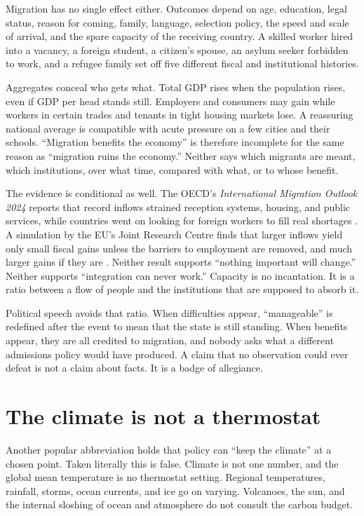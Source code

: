 \documentclass[12pt,a4paper]{book}
\begin{document}
Migration has no single effect either. Outcomes depend on age, education, legal status, reason for coming, family, language, selection policy, the speed and scale of arrival, and the spare capacity of the receiving country. A skilled worker hired into a vacancy, a foreign student, a citizen's spouse, an asylum seeker forbidden to work, and a refugee family set off five different fiscal and institutional histories.

Aggregates conceal who gets what. Total GDP rises when the population rises, even if GDP per head stands still. Employers and consumers may gain while workers in certain trades and tenants in tight housing markets lose. A reassuring national average is compatible with acute pressure on a few cities and their schools. ``Migration benefits the economy'' is therefore incomplete for the same reason as ``migration ruins the economy.'' Neither says which migrants are meant, which institutions, over what time, compared with what, or to whose benefit.

The evidence is conditional as well. The OECD's \emph{International Migration Outlook 2024} reports that record inflows strained reception systems, housing, and public services, while countries went on looking for foreign workers to fill real shortages \cite{OECDMigrationOutlook2024}. A simulation by the EU's Joint Research Centre finds that larger inflows yield only small fiscal gains unless the barriers to employment are removed, and much larger gains if they are \cite{JRCFiscalMigration2020}. Neither result supports ``nothing important will change.'' Neither supports ``integration can never work.'' Capacity is no incantation. It is a ratio between a flow of people and the institutions that are supposed to absorb it.

Political speech avoids that ratio. When difficulties appear, ``manageable'' is redefined after the event to mean that the state is still standing. When benefits appear, they are all credited to migration, and nobody asks what a different admissions policy would have produced. A claim that no observation could ever defeat is not a claim about facts. It is a badge of allegiance.

\section{The climate is not a thermostat}

Another popular abbreviation holds that policy can ``keep the climate'' at a chosen point. Taken literally this is false. Climate is not one number, and the global mean temperature is no thermostat setting. Regional temperatures, rainfall, storms, ocean currents, and ice go on varying. Volcanoes, the sun, and the internal sloshing of ocean and atmosphere do not consult the carbon budget.
\end{document}
